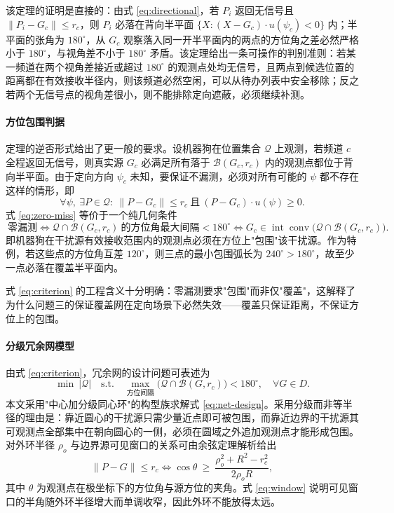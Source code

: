 该定理的证明是直接的：由式 \eqref{eq:directional}，若 $P_i$ 返回无信号且 $\lVert P_i-G_c\rVert\le r_c$，则 $P_i$ 必落在背向半平面 $\{X:(X-G_c)\cdot u(\psi_c)<0\}$ 内；半平面的张角为 $180^\circ$，从 $G_c$ 观察落入同一开半平面内的两点的方位角之差必然严格小于 $180^\circ$，与视角差不小于 $180^\circ$ 矛盾。该定理给出一条可操作的判别准则：若某一频道在两个视角差接近或超过 $180^\circ$ 的观测点处均无信号，且两点到候选位置的距离都在有效接收半径内，则该频道必然空闲，可以从待办列表中安全移除；反之若两个无信号点的视角差很小，则不能排除定向遮蔽，必须继续补测。

\paragraph{方位包围判据} 定理的逆否形式给出了更一般的要求。设机器狗在位置集合 $\mathcal Q$ 上观测，若频道 $c$ 全程返回无信号，则真实源 $G_c$ 必满足所有落于 $\mathcal B(G_c,r_c)$ 内的观测点都位于背向半平面。由于定向方向 $\psi_c$ 未知，要保证不漏测，必须对所有可能的 $\psi$ 都不存在这样的情形，即
\begin{equation}
\forall\psi,\ \exists P\in\mathcal Q:\ \lVert P-G_c\rVert\le r_c\ \text{且}\ (P-G_c)\cdot u(\psi)\ge0 .
\label{eq:zero-miss}
\end{equation}
式 \eqref{eq:zero-miss} 等价于一个纯几何条件
\begin{equation}
\boxed{\ \text{零漏测}\iff
\mathcal Q\cap\mathcal B(G_c,r_c)\ \text{的方位角最大间隔}<180^\circ
\iff G_c\in\operatorname{int}\operatorname{conv}\bigl(\mathcal Q\cap\mathcal B(G_c,r_c)\bigr).\ }
\label{eq:criterion}
\end{equation}
即机器狗在干扰源有效接收范围内的观测点必须在方位上"包围"该干扰源。作为特例，若这些点的方位角互差 $120^\circ$，则三点的最小包围弧长为 $240^\circ>180^\circ$，故至少一点必落在覆盖半平面内。

式 \eqref{eq:criterion} 的工程含义十分明确：零漏测要求"包围"而非仅"覆盖"，这解释了为什么问题三的保证覆盖网在定向场景下必然失效——覆盖只保证距离，不保证方位上的包围。

\paragraph{分级冗余网模型} 由式 \eqref{eq:criterion}，冗余网的设计问题可表述为
\begin{equation}
\min\ \lvert\mathcal Q\rvert
\quad\text{s.t.}\quad
\max_{\text{方位间隔}}\bigl(\mathcal Q\cap\mathcal B(G,r_c)\bigr)<180^\circ,
\quad\forall G\in D .
\label{eq:net-design}
\end{equation}
本文采用"中心加分级同心环"的构型族求解式 \eqref{eq:net-design}。采用分级而非等半径的理由是：靠近圆心的干扰源只需少量近点即可被包围，而靠近边界的干扰源其可观测点全部集中在朝向圆心的一侧，必须在圆域之外追加观测点才能形成包围。对外环半径 $\rho_o$ 与边界源可见窗口的关系可由余弦定理解析给出
\begin{equation}
\lVert P-G\rVert\le r_c
\iff
\cos\theta\ \ge\ \frac{\rho_o^2+R^2-r_c^2}{2\rho_o R},
\label{eq:window}
\end{equation}
其中 $\theta$ 为观测点在极坐标下的方位角与源方位的夹角。式 \eqref{eq:window} 说明可见窗口的半角随外环半径增大而单调收窄，因此外环不能放得太远。

